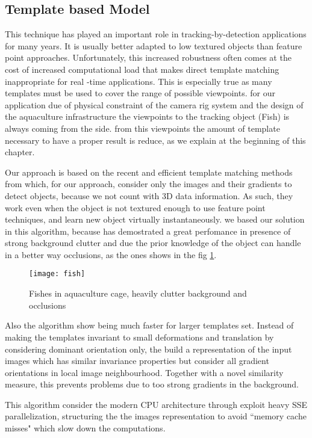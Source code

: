 \subsection{Template based Model}
\label{sec:templatedbased}
This technique has played an important role in tracking-by-detection applications for
many years. It is usually better adapted to low textured objects than feature point approaches. 
Unfortunately, this increased robustness often comes at the cost of
increased computational load that makes direct template matching inappropriate 
for real -time applications. This is especially true as many templates must be 
used to cover the range of possible viewpoints. for our application due of physical 
constraint of the camera rig system and the design of the aquaculture infrastructure
the viewpoints to the tracking object (Fish) is always coming from the side.
from this viewpoints the amount of template necessary to have a proper result is reduce, as we explain at the beginning of this chapter. 

Our approach is based on the recent and efficient template matching methods from
\citet{Hinterstoisser2011, Hinterstoisser2012} which, for our approach, consider only the images and their
gradients to detect objects, because we not count with 3D data information.
As such, they work even when the object is not textured 
enough to use feature point techniques, and learn new object virtually instantaneously.
we based our solution in this algorithm, because has demostrated a great perfomance
in presence of strong background clutter and due the prior knowledge of the object
can handle in a better way occlusions, as the ones shows in the fig \ref{fig:clutter}.


\begin{figure}[ht]
\centering
\texttt{[image: fish]}
\caption{Fishes in aquaculture cage, heavily clutter background and occlusions}
\label{fig:clutter}
\end{figure}

Also the algorithm show being much faster for larger templates set. Instead of 
making the templates invariant to small deformations and translation by considering
dominant orientation only, the build a representation of the input images which has
similar invariance properties but consider all gradient orientations in local image
neighbourhood. Together with a novel similarity measure, this prevents problems due
to too strong gradients in the background.

This algorithm consider the modern CPU architecture through exploit heavy SSE parallelization, 
structuring the the images 
representation to  avoid ``memory cache misses" which slow down the computations.

